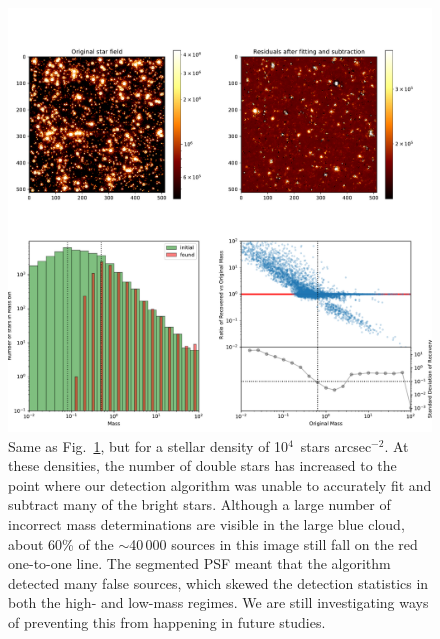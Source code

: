 \documentclass{aa}
\newcommand{\s}{$\sim$}
\newcommand{\h}[1]{$^{#1}$}
\newcommand{\spae}{stars arcsec$^{-2}$}
\begin{document}
\begin{appendix}
\begin{figure}
    \label{fig:results_lmc_1E3}
\end{figure}


\begin{figure}

    \centering
    \includegraphics[width=\textwidth]{tbl_stats_dist=50000_rho=10000.pdf}
    \caption{Same as Fig.~\ref{fig:results_lmc_1E3}, but for a stellar density of 10\h4~\spae.
    At these densities, the number of double stars has increased to the point where our detection algorithm was unable to accurately fit and subtract many of the bright stars.
    Although a large number of incorrect mass determinations are visible in the large blue cloud, about 60\% of the \s40\,000 sources in this image still fall on the red one-to-one line.
    The segmented PSF meant that the algorithm detected many false sources, which skewed the detection statistics in both the high- and low-mass regimes.
    We are still investigating ways of preventing this from happening in future studies.}

    \label{fig:results_lmc_1E4}

\end{figure}

\end{appendix}




\end{document}
